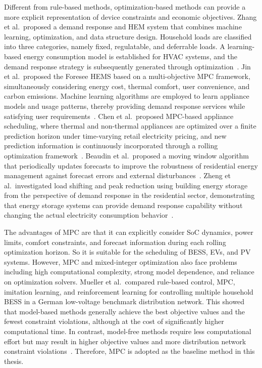 Different from rule-based methods, optimization-based methods can provide a more explicit representation of device constraints and economic objectives. Zhang et al.\ proposed a demand response and HEM system that combines machine learning, optimization, and data structure design. Household loads are classified into three categories, namely fixed, regulatable, and deferrable loads. A learning-based energy consumption model is established for HVAC systems, and the demand response strategy is subsequently generated through optimization~\parencite{7450180}. Jin et al.\ proposed the Foresee HEMS based on a multi-objective MPC framework, simultaneously considering energy cost, thermal comfort, user convenience, and carbon emissions. Machine learning algorithms are employed to learn appliance models and usage patterns, thereby providing demand response services while satisfying user requirements~\parencite{JIN20171583}. Chen et al.\ proposed MPC-based appliance scheduling, where thermal and non-thermal appliances are optimized over a finite prediction horizon under time-varying retail electricity pricing, and new prediction information is continuously incorporated through a rolling optimization framework~\parencite{Chen20131401}. Beaudin et al.\ proposed a moving window algorithm that periodically updates forecasts to improve the robustness of residential energy management against forecast errors and external disturbances~\parencite{6465896}. Zheng et al.\ investigated load shifting and peak reduction using building energy storage from the perspective of demand response in the residential sector, demonstrating that energy storage systems can provide demand response capability without changing the actual electricity consumption behavior~\parencite{ZHENG2014STORAGE}.

The advantages of MPC are that it can explicitly consider SoC dynamics, power limits, comfort constraints, and forecast information during each rolling optimization horizon. So it is suitable for the scheduling of BESS, EVs, and PV systems. However, MPC and mixed-integer optimization also face problems including high computational complexity, strong model dependence, and reliance on optimization solvers. Mueller et al.\ compared rule-based control, MPC, imitation learning, and reinforcement learning for controlling multiple household BESS in a German low-voltage benchmark distribution network. This showed that model-based methods generally achieve the best objective values and the fewest constraint violations, although at the cost of significantly higher computational time. In contrast, model-free methods require less computational effort but may result in higher objective values and more distribution network constraint violations~\parencite{MUELLER2025126465}. Therefore, MPC is adopted as the baseline method in this thesis.

